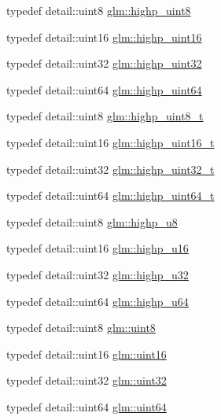 \begin{CompactItemize}
\item 
typedef detail::uint8 \hyperlink{group__gtc__type__precision_g2c27c6dd26e893786f04b10f99c1ee95}{glm::highp\_\-uint8}
\item 
typedef detail::uint16 \hyperlink{group__gtc__type__precision_g4d32967d45ba8365e2a05eaaac85e978}{glm::highp\_\-uint16}
\item 
typedef detail::uint32 \hyperlink{group__gtc__type__precision_g3145e44c73e2df7dfe4f3cb65974bf22}{glm::highp\_\-uint32}
\item 
typedef detail::uint64 \hyperlink{group__gtc__type__precision_g8079c653e20cda03d34b99de629a7b09}{glm::highp\_\-uint64}
\item 
typedef detail::uint8 \hyperlink{group__gtc__type__precision_g9ba529fcc75b82d23da979f0ce6e4518}{glm::highp\_\-uint8\_\-t}
\item 
typedef detail::uint16 \hyperlink{group__gtc__type__precision_g3145bc0ee80432c165e985a188a722b3}{glm::highp\_\-uint16\_\-t}
\item 
typedef detail::uint32 \hyperlink{group__gtc__type__precision_g8eb85ad460079c63b68866ae34637bda}{glm::highp\_\-uint32\_\-t}
\item 
typedef detail::uint64 \hyperlink{group__gtc__type__precision_g6e66f40c5909bfc872b068187fa6029e}{glm::highp\_\-uint64\_\-t}
\item 
typedef detail::uint8 \hyperlink{group__gtc__type__precision_g8a60abe782749c504fb5ae51eb8b49cc}{glm::highp\_\-u8}
\item 
typedef detail::uint16 \hyperlink{group__gtc__type__precision_g9da2178d7501d9c0f225fa1a7b70cb45}{glm::highp\_\-u16}
\item 
typedef detail::uint32 \hyperlink{group__gtc__type__precision_ge8e8a2c712653891a03c171795286ac5}{glm::highp\_\-u32}
\item 
typedef detail::uint64 \hyperlink{group__gtc__type__precision_g6006ea883d3c0491791650b2fb84de39}{glm::highp\_\-u64}
\item 
typedef detail::uint8 \hyperlink{group__gtc__type__precision_g1a7dcd8aac97cc8020817c94049deff2}{glm::uint8}
\item 
typedef detail::uint16 \hyperlink{group__gtc__type__precision_gd8c2939e1fdd8e5828b31d95c52255d5}{glm::uint16}
\item 
typedef detail::uint32 \hyperlink{group__gtc__type__precision_g202b6a53c105fcb7e531f9b443518451}{glm::uint32}
\item 
typedef detail::uint64 \hyperlink{group__gtc__type__precision_ge3632bf9b37da66233d78930dd06378a}{glm::uint64}

\end{CompactItemize}
